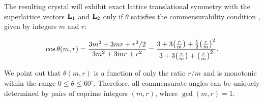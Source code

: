 The resulting crystal will exhibit exact lattice translational symmetry with the superlattice vectors \( \vb{L}_1 \) and \( \vb{L}_2 \) only if \( \theta \) satisfies the commensurability condition \cite{thesis_rennella, zou2018}, given by integers \( m \) and \( r \):

\begin{equation} \label{eq:costheta}
\cos\theta(m,r) = \frac{3m^2 + 3mr + r^2/2}{3m^2 + 3mr + r^2} = \frac{3 + 3 \qty(\frac{r}{m}) + \frac{1}{2} \qty(\frac{r}{m})^2}{3 + 3 \qty(\frac{r}{m}) + \qty(\frac{r}{m})^2}.
\end{equation}

We point out that \( \theta(m,r) \) is a function of only the ratio \( r/m \) and is monotonic within the range \( 0 \leq \theta \leq 60^\circ \). Therefore, all commensurate angles can be uniquely determined by pairs of coprime integers \( (m, r) \), where \( \gcd(m, r) = 1 \).

